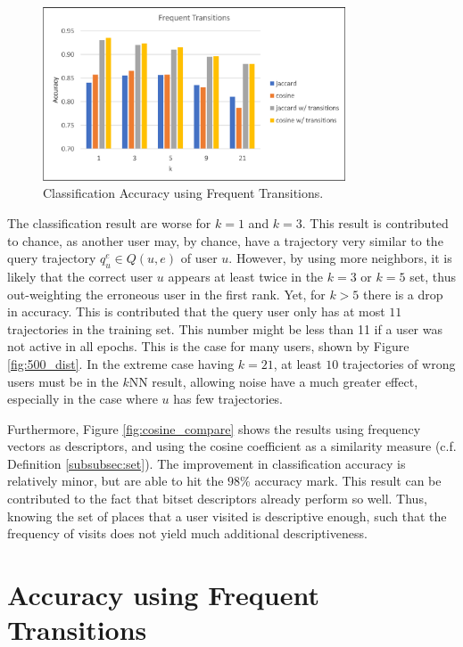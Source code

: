 \begin{figure}[tbh]
	\centering
	\includegraphics[width = 0.8\textwidth]{figures/topn_transitions}
  \caption{Classification Accuracy using Frequent Transitions.}
  \label{fig:transitions}
	\figSpace
\end{figure}

The classification result are worse for $k=1$ and $k=3$. This result is contributed to chance, as another user may, by chance, have a trajectory very similar to the query trajectory $q_u^e \in Q(u,e)$ of user $u$. However, by using more neighbors, it is likely that the correct user $u$ appears at least twice in the $k=3$ or $k=5$ set, thus out-weighting the erroneous user in the first rank. Yet, for $k>5$ there is a drop in accuracy. This is contributed that the query user only has at most $11$ trajectories in the training set. This number might be less than 11 if a user was not active in all epochs. This is the case for many users, shown by Figure \ref{fig:500_dist}. In the extreme case having $k=21$, at least $10$ trajectories of wrong users must be in the $k$NN result, allowing noise have a much greater effect, especially in the case where $u$ has few trajectories.

Furthermore, Figure \ref{fig:cosine_compare} shows the results using frequency vectors as descriptors, and using the cosine coefficient as a similarity measure (c.f. Definition \ref{subsubsec:set}). The improvement in classification accuracy is relatively minor, but are able to hit the $98\%$ accuracy mark. This result can be contributed to the fact that bitset descriptors already perform so well. Thus, knowing the set of places that a user visited is descriptive enough, such that the frequency of visits does not yield much additional descriptiveness.

\section{Accuracy using Frequent Transitions}


